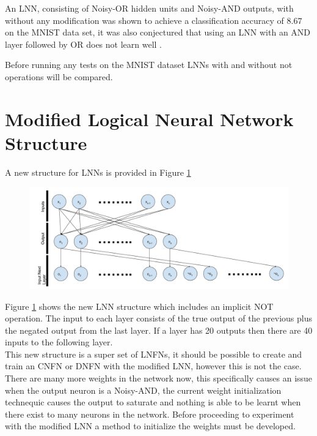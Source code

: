 An LNN, consisting of Noisy-OR hidden units and Noisy-AND outputs, with without any modification was shown to achieve a classification accuracy of $8.67$ on the MNIST data set, it was also conjectured that using an LNN with an AND layer followed by OR does not learn well \cite{LearningLogicalActivations}. 


Before running any tests on the MNIST dataset LNNs with and without not operations will be compared.

\section{Modified Logical Neural Network Structure} \label{sec:modified-lnn-structure}
A new structure for LNNs is provided in Figure \ref{fig:modified-lnn-structure}

\begin{figure}[H]
	\centering
	\begin{minipage}[b]{0.9\textwidth}
		\includegraphics[width=\textwidth]{Modified-LNN-Structure.png}
		\caption{}
		\label{fig:modified-lnn-structure}
	\end{minipage}
	\hfill
\end{figure}


Figure \ref{fig:modified-lnn-structure} shows the new LNN structure which includes an implicit NOT operation. The input to each layer consists of the true output of the previous plus the negated output from the last layer. If a layer has 20 outputs then there are 40 inputs to the following layer.\\

This new structure is a super set of LNFNs, it should be possible to create and train an CNFN or DNFN with the modified LNN, however this is not the case. There are many more weights in the network now, this specifically causes an issue when the output neuron is a Noisy-AND, the current weight initialization technequic causes the output to saturate and nothing is able to be learnt when there exist to many neurons in the network. Before proceeding to experiment with the modified LNN a method to initialize the weights must be developed.\\

